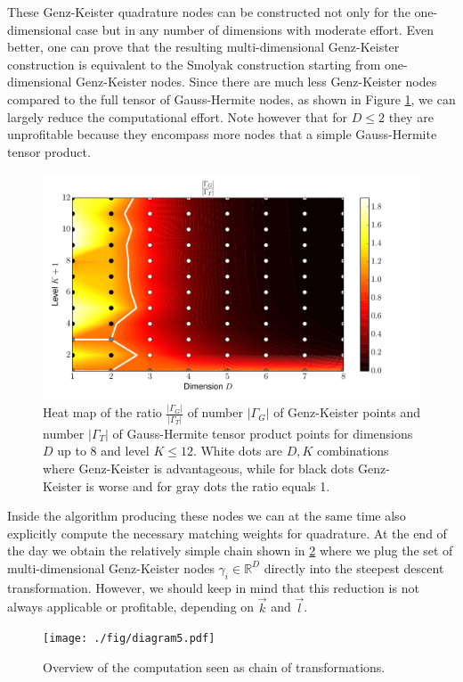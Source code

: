 \documentclass[a4paper,10pt]{article}
\begin{document}
These Genz-Keister quadrature nodes can be constructed not only
for the one-dimensional case but in any number of dimensions
with moderate effort. Even better, one can prove \cite{novak_ritter} that
the resulting multi-dimensional Genz-Keister construction is equivalent to the
Smolyak construction starting from one-dimensional Genz-Keister nodes.
Since there are much less Genz-Keister nodes compared to the full tensor
of Gauss-Hermite nodes, as shown in Figure \ref{fig:gk_hermitephy_ratio},
we can largely reduce the computational effort. Note however that for $D \leq 2$
they are unprofitable because they encompass more nodes that a simple Gauss-Hermite
tensor product.

\begin{figure}[h]
  \centering
  \includegraphics[width=0.8\linewidth]{./fig/gk_hermitephy_ratio.pdf}
  \caption{Heat map of the ratio $\frac{|\Gamma_{G}|}{|\Gamma_T|}$ of number $|\Gamma_G|$
  of Genz-Keister points and number $|\Gamma_T|$ of Gauss-Hermite tensor product
  points for dimensions $D$ up to 8 and level $K \leq 12$. White dots are $D,K$
  combinations where Genz-Keister is advantageous, while for black dots
  Genz-Keister is worse and for gray dots the ratio equals 1.}
  \label{fig:gk_hermitephy_ratio}
\end{figure}

Inside the algorithm producing these nodes we can at the same time also
explicitly compute the necessary matching weights for quadrature.
At the end of the day we obtain the relatively simple chain shown in
\ref{fig:transformation_chain_5} where we plug the set of multi-dimensional
Genz-Keister nodes $\gamma_i \in \mathbb{R}^D$ directly into the steepest
descent transformation. However, we should keep in mind that this reduction
is not always applicable or profitable, depending on $\vec{k}$ and $\vec{l}$.

\begin{figure}[h!]
  \centering
  \texttt{[image: ./fig/diagram5.pdf]}
  \caption{Overview of the computation seen as chain of transformations.}
  \label{fig:transformation_chain_5}
\end{figure}
\end{document}
